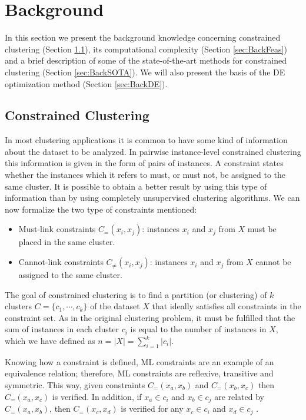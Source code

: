 \documentclass[review]{elsarticle}
\begin{document}
\section{Background} \label{sec:background}

In this section we present the background knowledge concerning constrained clustering (Section \ref{sec:BackCC}), its computational complexity (Section \ref{sec:BackFeas}) and a brief description of some of the state-of-the-art methods for constrained clustering (Section \ref{sec:BackSOTA}). We will also present the basis of the DE optimization method (Section \ref{sec:BackDE}).

\subsection{Constrained Clustering} \label{sec:BackCC}

In most clustering applications it is common to have some kind of information about the dataset to be analyzed. In pairwise instance-level constrained clustering this information is given in the form of pairs of instances. A constraint states whether the instances which it refers to must, or must not, be assigned to the same cluster. It is possible to obtain a better result by using this type of information than by using completely unsupervised clustering algorithms. We can now formalize the two type of constraints mentioned: 

\begin{itemize}

	\item Must-link constraints $C_=(x_i,x_j)$: instances $x_i$ and $x_j$ from $X$ must be placed in the same cluster.

	\item Cannot-link constraints $C_{\neq}(x_i,x_j)$: instances $x_i$ and $x_j$ from $X$ cannot be assigned to the same cluster.

\end{itemize}

The goal of constrained clustering is to find a partition (or clustering) of $k$ clusters $C = \{c_1, \cdots, c_k\}$ of the dataset $X$ that ideally satisfies all constraints in the constraint set. As in the original clustering problem, it must be fulfilled that the sum of instances in each cluster $c_i$ is equal to the number of instances in $X$, which we have defined as $n = |X| = \sum_{i = 1}^{k} |c_i|$.

Knowing how a constraint is defined, ML constraints are an example of an equivalence relation; therefore, ML constraints are reflexive, transitive and symmetric. This way, given constraints $C_=(x_a,x_b)$ and $C_=(x_b,x_c)$ then $C_=(x_a,x_c)$ is verified. In addition, if $x_a \in c_i$ and $x_b \in c_j$ are related by $C_=(x_a,x_b)$, then $C_=(x_c,x_d)$ is verified for any $x_c \in c_i$ and $x_d \in c_j$ \cite{davidson2007survey}.
\end{document}
